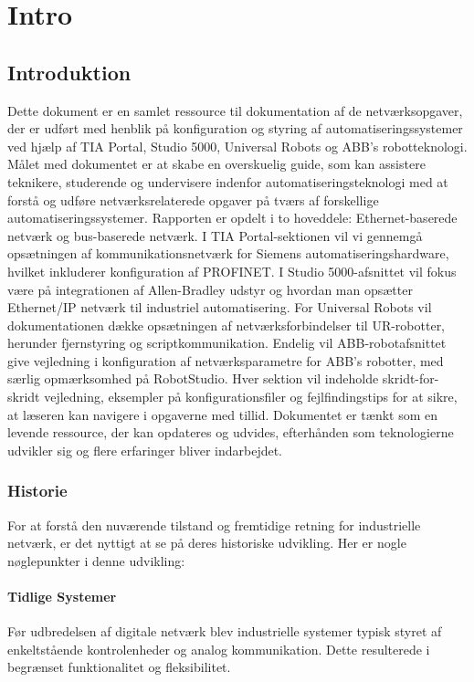\part{Intro}
\chapter{Introduktion}
\label{chapter:introduktion}
Dette dokument er en samlet ressource til dokumentation af de netværksopgaver, der er udført med henblik på konfiguration og styring af automatiseringssystemer ved hjælp af TIA Portal, Studio 5000, Universal Robots og ABB's robotteknologi. Målet med dokumentet er at skabe en overskuelig guide, som kan assistere teknikere, studerende og undervisere indenfor automatiseringsteknologi med at forstå og udføre netværksrelaterede opgaver på tværs af forskellige automatiseringssystemer.
\newline\newline
\noindent Rapporten er opdelt i to hoveddele: Ethernet-baserede netværk og bus-baserede netværk. I TIA Portal-sektionen vil vi gennemgå opsætningen af kommunikationsnetværk for Siemens automatiseringshardware, hvilket inkluderer konfiguration af PROFINET. I Studio 5000-afsnittet vil fokus være på integrationen af Allen-Bradley udstyr og hvordan man opsætter Ethernet/IP netværk til industriel automatisering. For Universal Robots vil dokumentationen dække opsætningen af netværksforbindelser til UR-robotter, herunder fjernstyring og scriptkommunikation. Endelig vil ABB-robotafsnittet give vejledning i konfiguration af netværksparametre for ABB's robotter, med særlig opmærksomhed på RobotStudio.
\newline\newline
\noindent Hver sektion vil indeholde skridt-for-skridt vejledning, eksempler på konfigurationsfiler og fejlfindingstips for at sikre, at læseren kan navigere i opgaverne med tillid. Dokumentet er tænkt som en levende ressource, der kan opdateres og udvides, efterhånden som teknologierne udvikler sig og flere erfaringer bliver indarbejdet.

\section{Historie}
\label{section:historie}
For at forstå den nuværende tilstand og fremtidige retning for industrielle netværk, er det nyttigt at se på deres historiske udvikling. Her er nogle nøglepunkter i denne udvikling:

\subsection{Tidlige Systemer}
Før udbredelsen af digitale netværk blev industrielle systemer typisk styret af enkeltstående kontrolenheder og analog kommunikation. Dette resulterede i begrænset funktionalitet og fleksibilitet.


